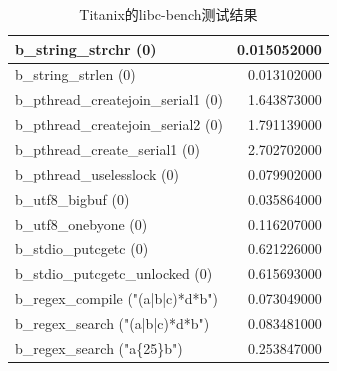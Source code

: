 \begin{table}[H]
\begin{tabular}{|l|r|}
        \hline
        b\_string\_strchr (0) & 0.015052000 \\
        \hline
        b\_string\_strlen (0) & 0.013102000 \\
        \hline
        b\_pthread\_createjoin\_serial1 (0) & 1.643873000 \\
        \hline
        b\_pthread\_createjoin\_serial2 (0) & 1.791139000 \\
        \hline
        b\_pthread\_create\_serial1 (0) & 2.702702000 \\
        \hline
        b\_pthread\_uselesslock (0) & 0.079902000 \\
        \hline
        b\_utf8\_bigbuf (0) & 0.035864000 \\
        \hline
        b\_utf8\_onebyone (0) & 0.116207000 \\
        \hline
        b\_stdio\_putcgetc (0) & 0.621226000 \\
        \hline
        b\_stdio\_putcgetc\_unlocked (0) & 0.615693000 \\
        \hline
        b\_regex\_compile ("(a|b|c)*d*b") & 0.073049000 \\
        \hline
        b\_regex\_search ("(a|b|c)*d*b") & 0.083481000 \\
        \hline
        b\_regex\_search ("a\{25\}b") & 0.253847000 \\
        \hline
    \end{tabular}
    \caption{Titanix的libc-bench测试结果}
\end{table}

